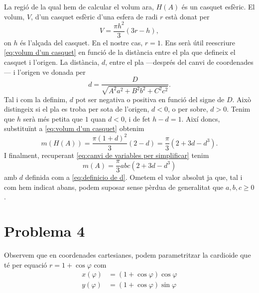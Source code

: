 \documentclass[12pt, a4paper]{article}
\begin{document}
La regió de la qual hem de calcular el volum ara, \( H(A) \) és un casquet esfèric. El volum, \( V \), d'un casquet esfèric d'una esfera de radi \( r \) està donat per
\begin{equation}
	V = \dfrac{\pi h^2}{3}(3r - h), \label{eq:volum d'un casquet}
\end{equation}
on \( h \) és l'alçada del casquet. En el nostre cas, \( r = 1 \). Ens serà útil reescriure \ref{eq:volum d'un casquet} en funció de la distància entre el pla que defineix el casquet i l'origen. La distància, \( d \), entre el pla ---després del canvi de coordenades---	i l'origen ve donada per 
\begin{equation}
	d = \dfrac{D}{\sqrt{A^2a^2 + B^2b^2 + C^2c^2}}. \label{eq:definicio de d}
\end{equation}
Tal i com la definim, \( d \) pot ser negativa o positiva en funció del signe de \( D \). Això distingeix si el pla es troba per sota de l'origen, \( d < 0 \), o per sobre, \( d > 0 \). Tenim que \( h \) serà més petita que \( 1 \) quan \( d < 0 \), i de fet \( h - d = 1 \). Així doncs, substituïnt a \ref{eq:volum d'un casquet} obtenim
\begin{equation}
	m(H(A)) = \dfrac{\pi(1 + d)^2}{3}(2 - d) = \dfrac{\pi}{3}\left(2 + 3d - d^3\right).
\end{equation}
I finalment, recuperant \ref{eq:canvi de variables per simplificar} tenim
\begin{equation}
	m(A) = \dfrac{\pi}{3}abc (2 + 3d - d^3)
\end{equation}
amb \( d \) definida com a \ref{eq:definicio de d}. Ometem el valor absolut ja que, tal i com hem indicat abans, podem suposar sense pèrdua de generalitat que \( a, b, c \geq 0 \).



\section*{Problema 4} \label{sec:problema 4} 
Observem que en coordenades cartesianes, podem parametritzar la cardioide que té per equació \( r = 1 + \cos{\varphi} \) com
\begin{equation}
  \begin{aligned}
    x(\varphi) &= (1 + \cos{\varphi})\cos{\varphi} \\
    y(\varphi) &= (1 + \cos{\varphi})\sin{\varphi}
  \end{aligned}
	\label{eq:parametrització cardioide de revolució}
\end{equation}
\end{document}
